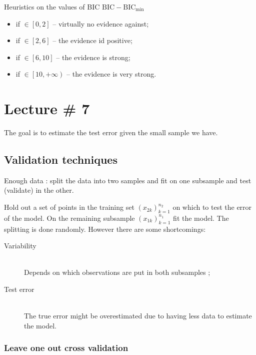 \documentclass[a4paper]{article}
\newcommand{\clo}[1]{{\left [ #1 \right ]}}
\newcommand{\clop}[1]{{\left [ #1 \right )}}
\newcommand{\brac}[1]{{\left ( #1 \right )}}
\begin{document}
Heuristics on the values of BIC $\text{BIC}-\text{BIC}_{\min}$
\begin{itemize}
	\item if $\in\clo{0,2}$ -- virtually no evidence against;
	\item if $\in\clo{2,6}$ -- the evidence id positive;
	\item if $\in\clo{6,10}$ -- the evidence is strong;
	\item if $\in\clop{10, +\infty}$ -- the evidence is very strong.
\end{itemize}




\section{Lecture \# 7} %
\label{sec:lecture_7}

The goal is to estimate the test error given the small sample we have.

\subsection{Validation techniques} %
\label{sub:validation_techniques}

Enough data : split the data into two samples and fit on one subsample and test (validate) in the other.

Hold out a set of points in the training set $\brac{x_{2k}}_{k=1}^{n_2}$ on which to test the error of the model.
On the remaining subsample $\brac{x_{1k}}_{k=1}^{n_1}$ fit the model. The splitting is done randomly.
However there are some shortcomings:
\begin{description}
	\item[Variability] \hfill\\
		Depends on which observations are put in both subsamples ;
	\item[Test error] \hfill\\
		The true error might be overestimated due to having less data to estimate the model.
\end{description}

\subsubsection{Leave one out cross validation} %
\label{ssub:leave_one_out_cross_validation}
\end{document}
